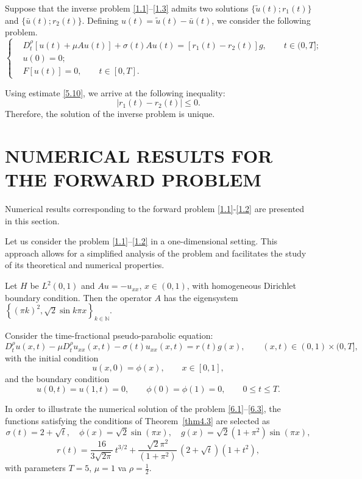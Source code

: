 \documentclass[reqno]{amsart}
\theoremstyle{definition}
\numberwithin{equation}{section}
\begin{document}
Suppose that the inverse problem \eqref{1.1}–\eqref{1.3} admits two solutions  $\{\tilde{u}(t);r_1(t)\}$ and $\{\bar{u}(t);r_2(t)\}$. Defining $u(t)=\tilde{u}(t) - \bar{u}(t)$, we consider the following problem.
\begin{equation}\label{5.20}
\left\{
\begin{aligned}
    & D_t^{\rho} [u(t) + \mu Au(t)] + \sigma(t) Au(t) = [r_1(t)-r_2(t)]g, \qquad t \in (0,T]; \\
    & u(0) = 0;\\
    & F[u(t)] = 0, \qquad t \in [0,T].
\end{aligned}
\right.
\end{equation}

Using estimate \eqref{5.10}, we arrive at the following inequality:
$$
|r_1(t) - r_2(t)| \le 0.
$$
Therefore, the solution of the inverse problem is unique.

\section{NUMERICAL RESULTS FOR THE FORWARD PROBLEM} Numerical results corresponding to the forward problem \eqref{1.1}-\eqref{1.2} are presented in this section.

Let us consider the problem \eqref{1.1}–\eqref{1.2} in a one-dimensional setting. This approach allows for a simplified analysis of the problem and facilitates the study of its theoretical and numerical properties.

Let $H$ be $L^2(0,1)$ and $Au=-u_{x x}$, $ x \in(0,1)$, with homogeneous Dirichlet boundary condition. Then the operator $A$ has the eigensystem $\left\{(\pi k)^2, \sqrt{2} \sin k \pi x\right\}_{k \in \mathbb{N}}$.

Consider the time-fractional pseudo-parabolic equation:
\begin{equation} \label{6.1}
D_t^{\rho}u(x,t) - \mu D_t^{\rho}u_{xx}(x,t) - \sigma(t) u_{xx}(x,t) = r(t)g(x), \qquad (x,t) \in (0,1) \times (0,T], 
\end{equation}
with the initial condition
\begin{equation}\label{6.2}
u(x,0) = \phi(x), \qquad x\in [0,1],  
\end{equation}
and the boundary condition
\begin{equation}\label{6.3}
u(0,t) = u(1,t)=0, \qquad \phi(0)=\phi(1)=0, \qquad 0 \le t \le T.
\end{equation}

In order to illustrate the numerical solution of the problem \eqref{6.1}–\eqref{6.3}, the functions satisfying the conditions of Theorem~\ref{thm4.3} are selected as
$$
\sigma(t) = 2+\sqrt{t}, \quad 
\phi(x) = \sqrt{2}\sin(\pi x), \quad 
g(x) = \sqrt{2}(1+\pi^2)\sin(\pi x),
$$
$$
r(t) = \frac{16}{3\sqrt{2\pi}}\, t^{3/2}
+ \frac{\sqrt{2}\pi^2}{(1+\pi^2)}\,(2+\sqrt{t})(1+t^2),
$$
with parameters $T=5$, $\mu=1$ va $\rho=\tfrac{1}{2}$.
\end{document}

